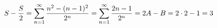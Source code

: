 \documentclass[preview]{standalone}
\begin{document}
\begin{align*}
\special{dvisvgm:raw <g id='unique000'>}S-\dfrac{S}{2}=\displaystyle\sum_{n=1}^{\infty}\dfrac{n^2-(n-1)^2}{2^n}=\sum_{n=1}^{\infty}\dfrac{2n-1}{2^n}=2A-B=2\cdot 2-1=3\special{dvisvgm:raw </g>}
\end{align*}
\end{document}
